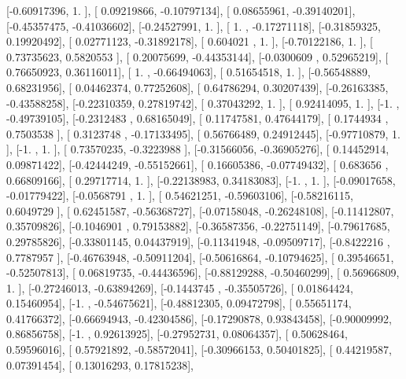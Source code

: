 \documentclass{article}
\begin{document}
       [-0.60917396,  1.        ],
       [ 0.09219866, -0.10797134],
       [ 0.08655961, -0.39140201],
       [-0.45357475, -0.41036602],
       [-0.24527991,  1.        ],
       [ 1.        , -0.17271118],
       [-0.31859325,  0.19920492],
       [ 0.02771123, -0.31892178],
       [ 0.604021  ,  1.        ],
       [-0.70122186,  1.        ],
       [ 0.73735623,  0.5820553 ],
       [ 0.20075699, -0.44353144],
       [-0.0300609 ,  0.52965219],
       [ 0.76650923,  0.36116011],
       [ 1.        , -0.66494063],
       [ 0.51654518,  1.        ],
       [-0.56548889,  0.68231956],
       [ 0.04462374,  0.77252608],
       [ 0.64786294,  0.30207439],
       [-0.26163385, -0.43588258],
       [-0.22310359,  0.27819742],
       [ 0.37043292,  1.        ],
       [ 0.92414095,  1.        ],
       [-1.        , -0.49739105],
       [-0.2312483 ,  0.68165049],
       [ 0.11747581,  0.47644179],
       [ 0.1744934 ,  0.7503538 ],
       [ 0.3123748 , -0.17133495],
       [ 0.56766489,  0.24912445],
       [-0.97710879,  1.        ],
       [-1.        ,  1.        ],
       [ 0.73570235, -0.3223988 ],
       [-0.31566056, -0.36905276],
       [ 0.14452914,  0.09871422],
       [-0.42444249, -0.55152661],
       [ 0.16605386, -0.07749432],
       [ 0.683656  ,  0.66809166],
       [ 0.29717714,  1.        ],
       [-0.22138983,  0.34183083],
       [-1.        ,  1.        ],
       [-0.09017658, -0.01779422],
       [-0.0568791 ,  1.        ],
       [ 0.54621251, -0.59603106],
       [-0.58216115,  0.6049729 ],
       [ 0.62451587, -0.56368727],
       [-0.07158048, -0.26248108],
       [-0.11412807,  0.35709826],
       [-0.1046901 ,  0.79153882],
       [-0.36587356, -0.22751149],
       [-0.79617685,  0.29785826],
       [-0.33801145,  0.04437919],
       [-0.11341948, -0.09509717],
       [-0.8422216 ,  0.7787957 ],
       [-0.46763948, -0.50911204],
       [-0.50616864, -0.10794625],
       [ 0.39546651, -0.52507813],
       [ 0.06819735, -0.44436596],
       [-0.88129288, -0.50460299],
       [ 0.56966809,  1.        ],
       [-0.27246013, -0.63894269],
       [-0.1443745 , -0.35505726],
       [ 0.01864424,  0.15460954],
       [-1.        , -0.54675621],
       [-0.48812305,  0.09472798],
       [ 0.55651174,  0.41766372],
       [-0.66694943, -0.42304586],
       [-0.17290878,  0.93843458],
       [-0.90009992,  0.86856758],
       [-1.        ,  0.92613925],
       [-0.27952731,  0.08064357],
       [ 0.50628464,  0.59596016],
       [ 0.57921892, -0.58572041],
       [-0.30966153,  0.50401825],
       [ 0.44219587,  0.07391454],
       [ 0.13016293,  0.17815238],
\end{document}
